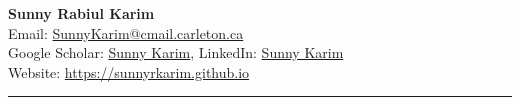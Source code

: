 \documentclass[11pt]{article}
\begin{document}
\begin{center}

{\Large\textbf{Sunny Rabiul Karim}}\\[-0.05em]

Email:
\href{mailto:SunnyKarim@cmail.carleton.ca}
{SunnyKarim@cmail.carleton.ca}
\\

Google Scholar:
\href{https://scholar.google.com/citations?user=daEdX70AAAAJ&hl=en}
{Sunny Karim},
LinkedIn:
\href{http://www.linkedin.com/in/sunny-karim-5a465076}
{Sunny Karim}
\\

Website:
\href{https://sunnyrkarim.github.io}
{https://sunnyrkarim.github.io}

\end{center}

\vspace{-0.35em}

\hrule

\vspace{0.85em}
\end{document}
